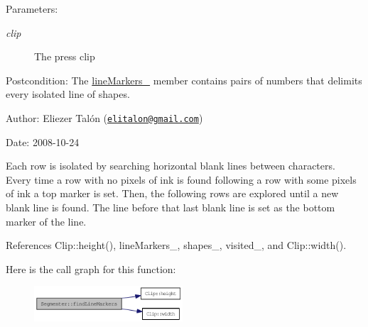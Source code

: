 \begin{Desc}
\item[Parameters:]
\begin{description}
\item[{\em clip}]The press clip\end{description}
\end{Desc}
\begin{Desc}
\item[Postcondition:]The \hyperlink{class_segmenter_2789fd760ed7604765b3b147be454c09}{lineMarkers\_\-} member contains pairs of numbers that delimits every isolated line of shapes.\end{Desc}
\begin{Desc}
\item[Author:]Eliezer Talón (\href{mailto:elitalon@gmail.com}{\tt elitalon@gmail.com}) \end{Desc}
\begin{Desc}
\item[Date:]2008-10-24\end{Desc}
Each row is isolated by searching horizontal blank lines between characters. Every time a row with no pixels of ink is found following a row with some pixels of ink a top marker is set. Then, the following rows are explored until a new blank line is found. The line before that last blank line is set as the bottom marker of the line. 

References Clip::height(), lineMarkers\_\-, shapes\_\-, visited\_\-, and Clip::width().

Here is the call graph for this function:\nopagebreak
\begin{figure}[H]
\begin{center}
\leavevmode
\includegraphics[width=157pt]{class_segmenter_ad8893282742e811dd7fff172ec03c85_cgraph}
\end{center}
\end{figure}


